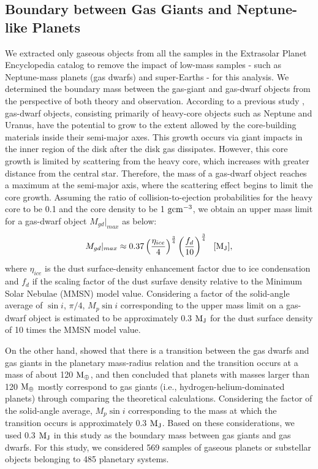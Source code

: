 \documentclass[twocolumn]{aastex62}
\begin{document}
\begin{CJK*}{UTF8}{min}
\subsection{Boundary between Gas Giants and Neptune-like Planets} \label{subsec:boundary}

We extracted only gaseous objects from all the samples in the Extrasolar Planet Encyclopedia catalog to remove the impact of low-mass samples - such as Neptune-mass planets (gas dwarfs) and super-Earths - for this analysis. We determined the boundary mass between the gas-giant and gas-dwarf objects from the perspective of both theory and observation. According to a previous study \citep{2004ApJ...604..388I}, gas-dwarf objects, consisting primarily of heavy-core objects such as Neptune and Uranus, have the potential to grow to the extent allowed by the core-building materials inside their semi-major axes. This growth occurs via giant impacts in the inner region of the disk after the disk gas dissipates. However, this core growth is limited by scattering from the heavy core, which increases with greater distance from the central star. Therefore, the mass of a gas-dwarf object reaches a maximum at the semi-major axis, where the scattering effect begins to limit the core growth. Assuming the ratio of collision-to-ejection probabilities for the heavy core to be 0.1 and the core density to be 1 $\rm gcm^{-3}$, we obtain an upper mass limit for a gas-dwarf object $M_{gd}|_{max}$ as below:
\begin{equation}
M_{gd}|_{max} \approx 0.37\left(\frac{\eta_{ice}}{4}\right)^\frac{3}{4}\left(\frac{f_d}{10}\right)^\frac{3}{4}\ \  [\rm M_J] ,
\end{equation}
where $\eta_{ice}$ is the dust surface-density enhancement factor due to ice condensation and $f_d$ if the scaling factor of the dust surfave density relative to the Minimum Solar Nebulae (MMSN) model value. Considering a factor of the solid-angle average of $\sin{i}$, $\pi/4$, $M_{p}{\sin}i$ corresponding to the upper mass limit on a gas-dwarf object is estimated to be approximately 0.3 $\rm M_J$ for the dust surface density of 10 times the MMSN model value.

On the other hand, \cite{2017A&A...604A..83B} showed that there is a transition between the gas dwarfs and gas giants in the planetary mass-radius relation and the transition occurs at a mass of about 120 $\rm M_{\oplus}$, and then concluded that planets with masses larger than 120 $\rm M_{\oplus}$ mostly correspond to gas giants (i.e., hydrogen-helium-dominated planets) through comparing the theoretical calculations. Considering the factor of the solid-angle average, $M_{p}{\sin}i$ corresponding to the mass at which the transition occurs is approximately 0.3 $\rm M_J$. Based on these considerations, we used 0.3 $\rm M_J$ in this study as the boundary mass between gas giants and gas dwarfs. For this study, we considered 569 samples of gaseous planets or substellar objects belonging to 485 planetary systems.



\end{CJK*}
\end{document}
